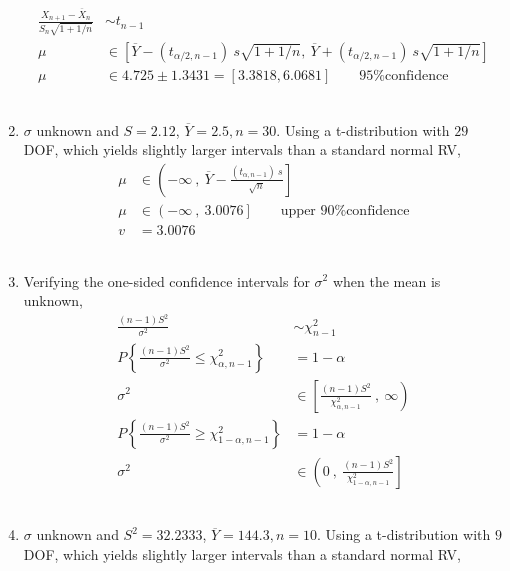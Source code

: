 \begin{enumerate}
		\begin{align}
			\frac{X_{n+1} - \overline{X}_n}{S_n \sqrt{1 + 1/n}} &\sim t_{n-1} \nonumber \\
			\mu &\in \left[ \overline{Y} - (t_{\alpha/2, n-1})\ s \sqrt{1 + 1/n}, \ \overline{Y} + (t_{\alpha/2, n-1})\ s \sqrt{1 + 1/n} \right] \nonumber \\
			\mu &\in 4.725 \pm 1.3431 = [3.3818, 6.0681] \qquad \text{95\% confidence} 
		\end{align}\\
	
	
	\item  $ \sigma $ unknown and $ S = 2.12 $, $ \overline{Y} = 2.5, n = 30$. Using a t-distribution with $ 29 $ DOF, which yields slightly larger intervals than a standard normal RV,\\
	
		\begin{align}
			\mu &\in \left(-\infty\ ,\  \overline{Y} - \frac{(t_{\alpha, n-1})\ s}{\sqrt{n}} \right] \nonumber \\
			\mu &\in \left(-\infty\ ,\ 3.0076  \right] \qquad \text{upper 90\% confidence} \nonumber \\
			v &= 3.0076
		\end{align}\\
	
	
	\item  Verifying the one-sided confidence intervals for $ \sigma^2 $ when the mean is unknown,\\
	
		\begin{align}
			\frac{(n-1)S^2}{\sigma^2} &\sim \chi^2_{n-1} \nonumber \\
			P \left\{ \frac{(n-1)S^2}{\sigma^2} \leq \chi^2_{\alpha, n-1} \right\} &= 1 - \alpha \nonumber \\
			\sigma^2 &\in \left[ \frac{(n-1)S^2}{\chi^2_{\alpha, n-1}}\ ,\ \infty \right) \\
			P \left\{ \frac{(n-1)S^2}{\sigma^2} \geq \chi^2_{1 - \alpha, n-1} \right\} &= 1 - \alpha \nonumber \\
			\sigma^2 &\in \left(0\ ,\ \frac{(n-1)S^2}{\chi^2_{1-\alpha, n-1}} \right]
		\end{align}\\
	
	
	\item  $ \sigma $ unknown and $ S^2 = 32.2333 $, $ \overline{Y} = 144.3, n = 10$. Using a t-distribution with $ 9 $ DOF, which yields slightly larger intervals than a standard normal RV,\\
	

\end{enumerate}
